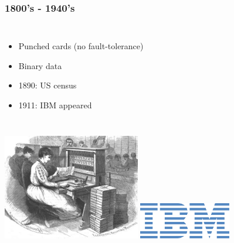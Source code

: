 \documentclass{beamer}
\begin{document}
\begin{frame}
\frametitle{1800's - 1940's}
\begin{columns}[c] 
\column{30em}
\begin{itemize}
  \justifying
  \item Punched cards (no fault-tolerance)
  \item Binary data
  \item 1890: US census
  \item 1911: IBM appeared
\end{itemize}
\end{columns}
\vspace{0.5cm}
\begin{columns}[c] 
\includegraphics[width=6cm]{figs/punch_card.pdf}
\hspace*{1cm}\includegraphics[width=4cm]{figs/ibm.pdf}
\end{columns}
\end{frame}
\end{document}
